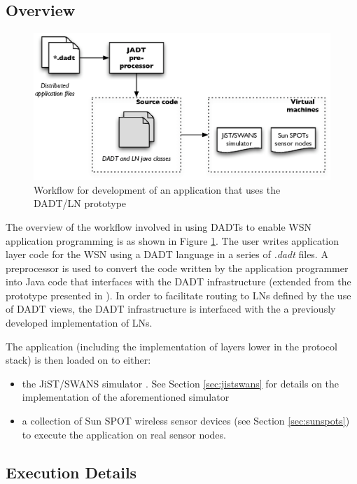 \subsection{Overview}
\begin{figure}
\centering
\label{Fig:DADTLN_architecture}
\includegraphics[scale=0.71]{img/DADTLN_architecture.eps} \caption[DADT/LN
application workflow]{Workflow for development of an application that uses
the DADT/LN prototype}
\end{figure} 
The overview of the workflow involved in using DADTs to enable WSN application
programming is as shown in Figure \ref{Fig:DADTLN_architecture}. The user writes
application layer code for the WSN using a DADT language in a series of
\emph{.dadt} files. A preprocessor is used to convert the code written by the
application programmer into Java code that interfaces with the DADT
infrastructure (extended from the prototype presented in
\cite{migliavacca_DADT:2006}). In order to facilitate routing to LNs defined by
the use of DADT views, the DADT infrastructure is interfaced with the a
previously developed implementation of LNs. 

The application (including the implementation of layers lower in the protocol
stack) is then loaded on to either:
\begin{itemize}
\item the JiST/SWANS simulator \cite{barr_JIST:2005, barr_SWANS}. See Section \ref{sec:jistswans} for details on the implementation of
the aforementioned simulator
\item a collection of Sun SPOT wireless sensor devices \cite{simon_squawk:2006}
(see Section \ref{sec:sunspots}) to execute the application on real sensor nodes.
\end{itemize}

\subsection{Execution Details}

